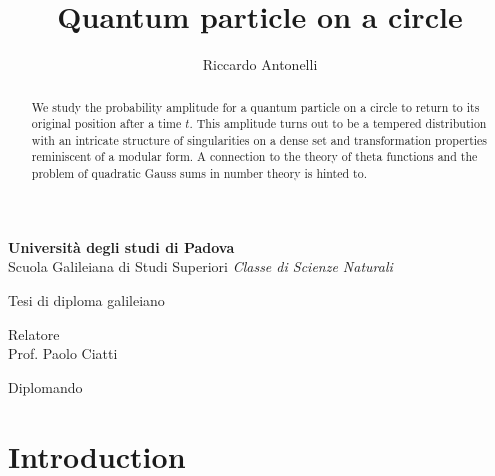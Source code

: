 \documentclass{article}
\title{Quantum particle on a circle}
\author{Riccardo Antonelli}
\begin{document}
\makeatletter
\begin{center} \Large
    \vfill
    {\LARGE \textbf{Universit\`a degli studi di Padova}}\\
    \vspace{30pt}
    Scuola Galileiana di Studi Superiori \vfill
    \emph{Classe di Scienze Naturali}\\ \vfill

    Tesi di diploma galileiano\\ \vfill

    {\Huge \bfseries \@title }
    \vfill

\end{center}

\vspace{100pt}

\begin{multicols}{2} \Large
    \begin{flushleft}
    Relatore\\
    Prof. Paolo Ciatti
\end{flushleft}

    \columnbreak

    \begin{flushright}
    Diplomando\\
    \@author
\end{flushright}

\end{multicols}

\vfill


\newpage

\maketitle

\begin{abstract}
    We study the probability amplitude for a quantum particle on a circle to return to its original position after a time $t$. This amplitude turns out to be a tempered distribution with an intricate structure of singularities on a dense set and transformation properties reminiscent of a modular form. A connection to the theory of theta functions and the problem of quadratic Gauss sums in number theory is hinted to.
\end{abstract}

\tableofcontents

\pagebreak

\section{Introduction}
\end{document}
